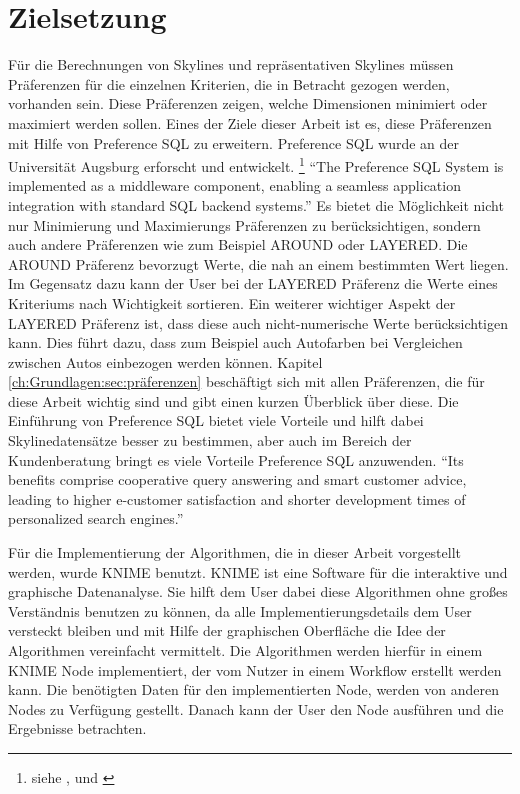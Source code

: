 \section{Zielsetzung}
\label{ch:Einleitung:sec:Zielsetzung}
Für die Berechnungen von Skylines und repräsentativen Skylines müssen Präferenzen für die einzelnen Kriterien, die in Betracht gezogen werden, vorhanden sein. Diese Präferenzen zeigen, welche Dimensionen minimiert oder maximiert werden sollen.
Eines der Ziele dieser Arbeit ist es, diese Präferenzen mit Hilfe von Preference SQL zu erweitern. Preference SQL wurde an der Universität Augsburg erforscht und entwickelt. \footnote{siehe \cite{kiessling2011preference}, \cite{kiessling2002foundations} und \cite{kiessling2002preference}}
\enquote{The Preference SQL System is implemented as a middleware component, enabling a seamless application integration with standard SQL backend systems.} \cite[p. 1]{kiessling2011preference}
Es bietet die Möglichkeit nicht nur Minimierung und Maximierungs Präferenzen zu berücksichtigen, sondern auch andere Präferenzen wie zum Beispiel AROUND oder LAYERED. Die AROUND Präferenz bevorzugt Werte, die nah an einem bestimmten Wert liegen. Im Gegensatz dazu kann der User bei der LAYERED Präferenz die Werte eines Kriteriums nach Wichtigkeit sortieren. Ein weiterer wichtiger Aspekt der LAYERED Präferenz ist, dass diese auch nicht-numerische Werte berücksichtigen kann. Dies führt dazu, dass zum Beispiel auch Autofarben bei Vergleichen zwischen Autos einbezogen werden können. Kapitel \ref{ch:Grundlagen:sec:präferenzen} beschäftigt sich mit allen Präferenzen, die für diese Arbeit wichtig sind und gibt einen kurzen Überblick über diese.
Die Einführung von Preference SQL bietet viele Vorteile und hilft dabei Skylinedatensätze besser zu bestimmen, aber auch im Bereich der Kundenberatung bringt es viele Vorteile Preference SQL anzuwenden.
\enquote{Its benefits comprise cooperative query answering and smart customer advice, leading to higher e-customer satisfaction and shorter development times of personalized search engines.}\cite[p. 1]{kiessling2002preference}

Für die Implementierung der Algorithmen, die in dieser Arbeit vorgestellt werden, wurde KNIME benutzt. KNIME ist eine Software für die interaktive und graphische Datenanalyse. Sie hilft dem User dabei diese Algorithmen ohne großes Verständnis benutzen zu können, da alle Implementierungsdetails dem User versteckt bleiben und mit Hilfe der graphischen Oberfläche die Idee der Algorithmen vereinfacht vermittelt. Die Algorithmen werden hierfür in einem KNIME Node implementiert, der vom Nutzer in einem Workflow erstellt werden kann. Die benötigten Daten für den implementierten Node, werden von anderen Nodes zu Verfügung gestellt. Danach kann der User den Node ausführen und die Ergebnisse betrachten. 
